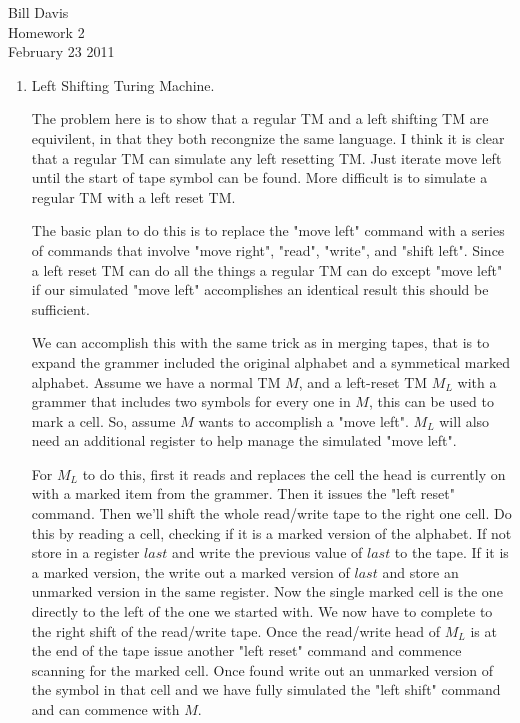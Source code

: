 \documentclass[11pt,fleqn]{article}
\begin{document}
\newcommand{\mbf}[1]{\mbox{{\bfseries #1}}}
\newcommand{\N}{\mbf{N}}
\renewcommand{\O}{\mbf{O}}

\noindent Bill Davis \\
Homework 2 \\
February 23 2011 

\begin{enumerate}
\item Left Shifting Turing Machine. 

The problem here is to show that a regular TM and a left shifting TM are equivilent, in that they both recongnize the same language. I think it is clear that a regular TM can simulate any left resetting TM. Just iterate move left until the start of tape symbol can be found. More difficult is to simulate a regular TM with a left reset TM. 

The basic plan to do this is to replace the "move left" command with a series of commands that involve "move right", "read", "write", and "shift left". Since a left reset TM can do all the things a regular TM can do except "move left" if our simulated "move left" accomplishes an identical result this should be sufficient. 

We can accomplish this with the same trick as in merging tapes, that is to expand the grammer included the original alphabet and a symmetical marked alphabet. Assume we have a normal TM $M$, and a left-reset TM $M_L$ with a grammer that includes two symbols for every one in $M$, this can be used to mark a cell. So, assume $M$ wants to accomplish a "move left".  $M_L$ will also need an additional register to help manage the simulated "move left".

For $M_L$ to do this, first it reads and replaces the cell the head is currently on with a marked item from the grammer. Then it issues the "left reset" command. Then we'll shift the whole read/write tape to the right one cell. Do this by reading a cell, checking if it is a marked version of the alphabet. If not store in a register $last$ and write the previous value of $last$ to the tape. If it is a marked version, the write out a marked version of $last$ and store an unmarked version in the same register. Now the single marked cell is the one directly to the left of the one we started with. We now have to complete to the right shift of the read/write tape. Once the read/write head of $M_L$ is at the end of the tape issue another "left reset" command and commence scanning for the marked cell. Once found write out an unmarked version of the symbol in that cell and we have fully simulated the "left shift" command and can commence with $M$. 


\end{enumerate}
\end{document}
